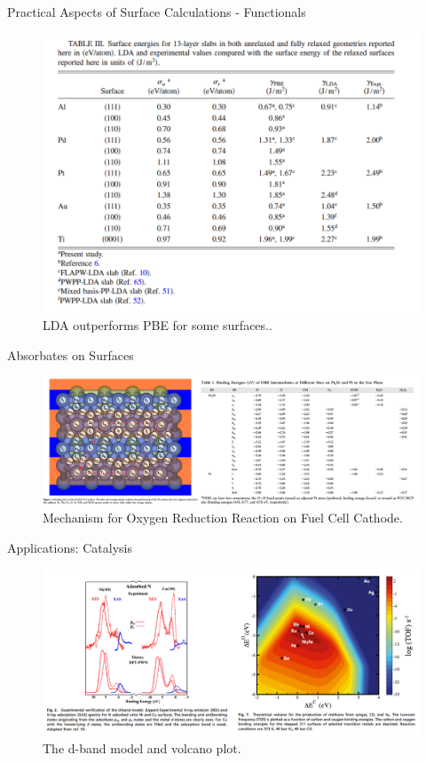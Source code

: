 \documentclass[aspectratio=169]{beamer}
\begin{document}
    \begin{frame}{Practical Aspects of Surface Calculations - Functionals}
        \begin{figure}
            \centering
            \includegraphics[width=0.5\linewidth]{lectures/figures/11_surface_functionals.png}
            \caption{LDA outperforms PBE for some surfaces.\cite{singh-millerSurfaceEnergiesWork2009}.}
        \end{figure}
    \end{frame}

    \begin{frame}{Absorbates on Surfaces}
        \begin{figure}
            \centering
            \includegraphics[width=\linewidth]{lectures/figures/11_binding.png}
            \caption{Mechanism for Oxygen Reduction Reaction on  Fuel Cell Cathode.\cite{shaMechanismOxygenReduction2012}}
        \end{figure}
    \end{frame}


    \begin{frame}{Applications: Catalysis}
        \begin{figure}
            \centering
            \includegraphics[width=\linewidth]{lectures/figures/11_catalysis.png}
            \caption{The d-band model and volcano plot.\cite{norskovSurfaceChemistrySpecial2011}}
        \end{figure}
    \end{frame}
\end{document}

